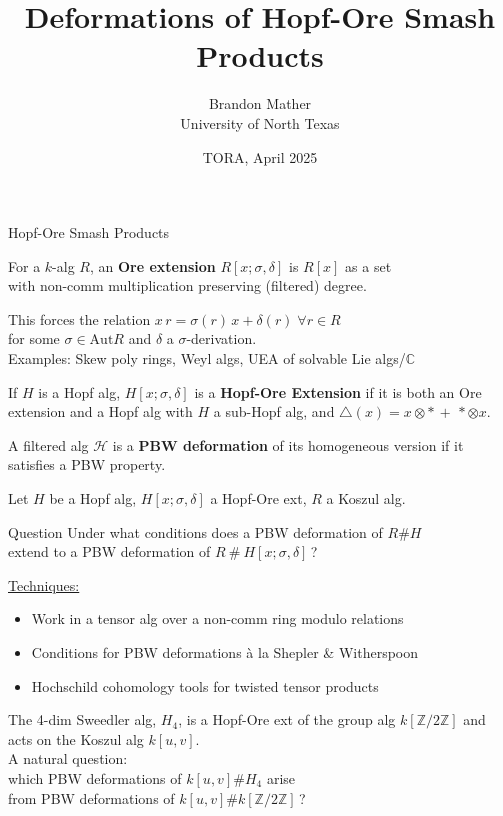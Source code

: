 \documentclass{beamer}
\title{Deformations of Hopf-Ore Smash Products}
\author{Brandon Mather\\ University of North Texas}
\date{TORA, April 2025}
\begin{document}
\maketitle

\begin{frame}{Hopf-Ore Smash Products}
\begin{definition}
    For a \(k\)-alg \(R\), an \textbf{Ore extension} \(R[x;\sigma,\delta]\) is \(R[x]\) as a set \\with non-comm multiplication preserving (filtered) degree. 
\end{definition}
This forces the relation \(x\,r=\sigma(r)\,x+\delta(r)\;\forall r\in R\) \\ for some \(\sigma\in \text{Aut}R\) and \(\delta\) a \(\sigma\)-derivation.
\\Examples: Skew poly rings, Weyl algs, UEA of solvable Lie algs/\(\mathbb{C}\)
\begin{definition}
    If \(H\) is a Hopf alg, \(H[x;\sigma,\delta]\) is a \textbf{Hopf-Ore Extension} if it is both an Ore extension and a Hopf alg with \(H\) a sub-Hopf alg, and \(\triangle(x)=x\otimes \ast\,+\,*\otimes x\).
\end{definition}
\begin{definition}
    A filtered alg \(\mathcal{H}\) is a \textbf{PBW deformation} of its homogeneous version if it satisfies a PBW property.
\end{definition}
\end{frame}

\begin{frame} 
    Let \(H\) be a Hopf alg, \(H[x;\sigma,\delta]\) a Hopf-Ore ext, \(R\) a Koszul alg.
\begin{beamerboxesrounded}{Question}
    Under what conditions does a PBW deformation of \(R\#H\) \\extend to a PBW deformation of \(R\ \#\ H[x;\sigma,\delta]\)\,?
\end{beamerboxesrounded}

\underline{Techniques:}
\begin{itemize}
    \item Work in a tensor alg over a non-comm ring modulo relations
    \item Conditions for PBW deformations \`a la Shepler \& Witherspoon
    \item Hochschild cohomology tools for twisted tensor products
\end{itemize}
\begin{example}
   The 4-dim Sweedler alg, \(H_4\), is a  Hopf-Ore ext of the group alg \(k[\mathbb{Z}/2\mathbb{Z}]\) and acts on the Koszul alg \(k[u,v]\).
   \\A natural question: \\which PBW deformations of \(k[u,v]\#H_4\) arise \\ \hspace{0.2cm}from PBW deformations of \(k[u,v]\#k[\mathbb{Z}/2\mathbb{Z}]\)\,?
\end{example}

\end{frame}
\end{document}
